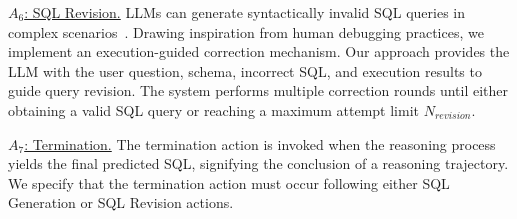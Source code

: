 \uline{$A_6$: SQL Revision.}
LLMs can generate syntactically invalid SQL queries in complex scenarios~\cite{macsql, CHASE}. 
Drawing inspiration from human debugging practices, we implement an execution-guided correction mechanism. Our approach provides the LLM with the user question, schema, incorrect SQL, and execution results to guide query revision. 
The system performs multiple correction rounds until either obtaining a valid SQL query or reaching a maximum attempt limit $N_{revision}$.


\uline{$A_7$: Termination.}
The termination action is invoked when the reasoning process yields the final predicted SQL, signifying the conclusion of a reasoning trajectory. We specify that the termination action must occur following either SQL Generation or SQL Revision actions.

